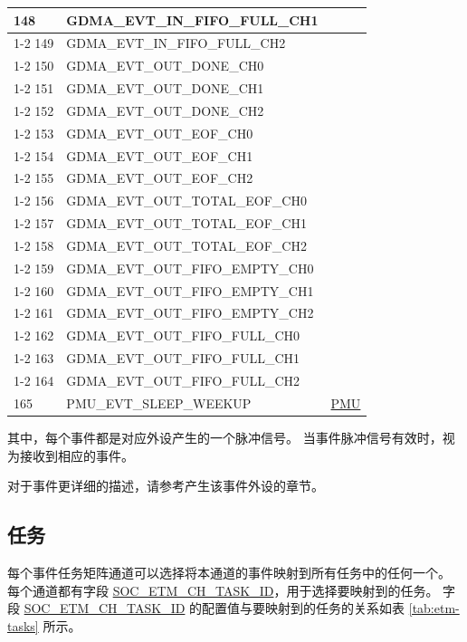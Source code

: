 \documentclass[main\_\_CN.tex]{subfiles}
\begin{document}
\begin{longtable}{ | l | l | l | }
148 & GDMA\_EVT\_IN\_FIFO\_FULL\_CH1   & \\ \cline{1-2}
149 & GDMA\_EVT\_IN\_FIFO\_FULL\_CH2   & \\ \cline{1-2}
150 & GDMA\_EVT\_OUT\_DONE\_CH0 & \\ \cline{1-2}
151 & GDMA\_EVT\_OUT\_DONE\_CH1 & \\ \cline{1-2}
152 & GDMA\_EVT\_OUT\_DONE\_CH2 & \\ \cline{1-2}
153 & GDMA\_EVT\_OUT\_EOF\_CH0  & \\ \cline{1-2}
154 & GDMA\_EVT\_OUT\_EOF\_CH1  & \\ \cline{1-2}
155 & GDMA\_EVT\_OUT\_EOF\_CH2  & \\ \cline{1-2}
156 & GDMA\_EVT\_OUT\_TOTAL\_EOF\_CH0  & \\ \cline{1-2}
157 & GDMA\_EVT\_OUT\_TOTAL\_EOF\_CH1  & \\ \cline{1-2}
158 & GDMA\_EVT\_OUT\_TOTAL\_EOF\_CH2  & \\ \cline{1-2}
159 & GDMA\_EVT\_OUT\_FIFO\_EMPTY\_CH0 & \\ \cline{1-2}
160 & GDMA\_EVT\_OUT\_FIFO\_EMPTY\_CH1 & \\ \cline{1-2}
161 & GDMA\_EVT\_OUT\_FIFO\_EMPTY\_CH2 & \\ \cline{1-2}
162 & GDMA\_EVT\_OUT\_FIFO\_FULL\_CH0  & \\ \cline{1-2}
163 & GDMA\_EVT\_OUT\_FIFO\_FULL\_CH1  & \\ \cline{1-2}
164 & GDMA\_EVT\_OUT\_FIFO\_FULL\_CH2  & \\ \hline
165 & PMU\_EVT\_SLEEP\_WEEKUP   & \hyperref[mod:lowpowm]{PMU} \\ \hline
\end{longtable}

其中，每个事件都是对应外设产生的一个脉冲信号。 当事件脉冲信号有效时，视为接收到相应的事件。

对于事件更详细的描述，请参考产生该事件外设的章节。

\subsection{任务}
\label{sec:evntaskmatrix-tasks}

每个事件任务矩阵通道可以选择将本通道的事件映射到所有任务中的任何一个。 每个通道都有字段 \hyperref[fielddesc:SOCETMCH0TASKID]{SOC\_ETM\_CH\_TASK\_ID}，用于选择要映射到的任务。 字段 \hyperref[fielddesc:SOCETMCH0TASKID]{SOC\_ETM\_CH\_TASK\_ID} 的配置值与要映射到的任务的关系如表 \ref{tab:etm-tasks} 所示。
\end{document}
